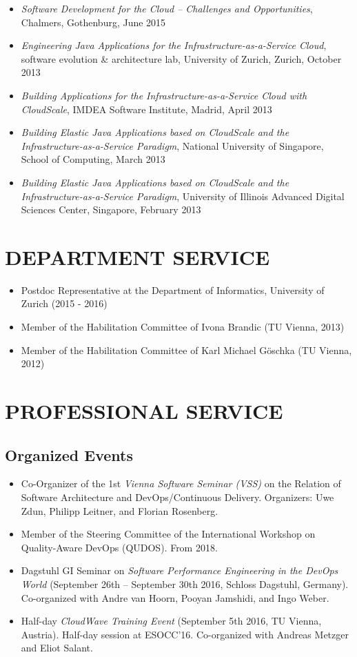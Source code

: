 \documentclass[paper=letter,fontsize=11pt]{scrartcl} %
\newcommand{\NewPart}[2]{\section*{\uppercase{#1} #2}}
\begin{document}
\begin{itemize}
\item \emph{Software Development for the Cloud -- Challenges and Opportunities}, Chalmers, Gothenburg, June 2015
\item \emph{Engineering Java Applications for the Infrastructure-as-a-Service Cloud}, software evolution \& architecture lab, University of Zurich, Zurich, October 2013
\item \emph{Building Applications for the Infrastructure-as-a-Service Cloud with CloudScale}, IMDEA Software Institute, Madrid, April 2013
\item \emph{Building Elastic Java Applications based on CloudScale and the Infrastructure-as-a-Service Paradigm}, National University of Singapore, School of Computing, March 2013
\item \emph{Building Elastic Java Applications based on CloudScale and the Infrastructure-as-a-Service Paradigm}, University of Illinois Advanced Digital Sciences Center, Singapore, February 2013
\end{itemize}

\NewPart{Department Service}{}
\begin{itemize}
\item Postdoc Representative at the Department of Informatics, University of Zurich (2015 - 2016)
\item Member of the Habilitation Committee of Ivona Brandic (TU Vienna, 2013)
\item Member of the Habilitation Committee of Karl Michael G\"oschka (TU Vienna, 2012)
\end{itemize}

\NewPart{Professional Service}{}

\subsection*{Organized Events}
\begin{itemize}
\item Co-Organizer of the 1st \emph{Vienna Software Seminar (VSS)} on the Relation of Software Architecture and DevOps/Continuous Delivery. Organizers: Uwe Zdun, Philipp Leitner, and Florian Rosenberg.
\item Member of the Steering Committee of the International Workshop on Quality-Aware DevOps (QUDOS). From 2018.
\item Dagstuhl GI Seminar on \emph{Software Performance Engineering in the DevOps World} (September 26th – September 30th 2016, Schloss Dagstuhl, Germany). Co-organized with Andre van Hoorn, Pooyan Jamshidi, and Ingo Weber.
\item Half-day \emph{CloudWave Training Event} (September 5th 2016, TU Vienna, Austria). Half-day session at ESOCC'16. Co-organized with Andreas Metzger and Eliot Salant.
\end{itemize}
\end{document}
